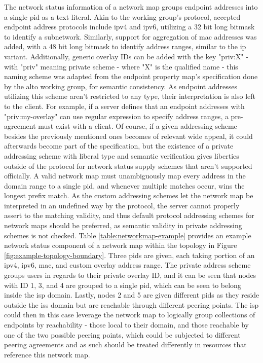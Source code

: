     The network status information of a network map groups endpoint addresses into a single \gls{pid} as a text literal.
    Akin to the working group's protocol, accepted endpoint address protocols include \gls{ipv4} and \gls{ipv6}, utilizing a 32 bit long bitmask to identify a subnetwork.
    Similarly, support for aggregation of \gls{mac} addresses was added, with a 48 bit long bitmask to identify address ranges, similar to the \gls{ip} variant.
    Additionally, generic overlay IDs can be added with the key "priv:X" - with "priv" meaning private scheme - where "X" is the qualified name - this naming scheme was adapted from the endpoint property map's specification done by the \gls{alto} working group, for semantic consistency.
    As endpoint addresses utilizing this scheme aren't restricted to any type, their interpretation is also left to the client.
    For example, if a server defines that an endpoint addresses with "priv:my-overlay" can use regular expression to specify address ranges, a pre-agreement must exist with a client.
    Of course, if a given addressing scheme besides the previously mentioned ones becomes of relevant wide appeal, it could afterwards become part of the specification, but the existence of a private addressing scheme with liberal type and semantic verification gives liberties outside of the protocol for network status supply schemes that aren't supported officially.
    A valid network map must unambiguously map every address in the domain range to a single \gls{pid}, and whenever multiple matches occur, wins the longest prefix match.
    As the custom addressing schemes let the network map be interpreted in an undefined way by the protocol, the server cannot properly assert to the matching validity, and thus default protocol addressing schemes for network maps should be preferred, as semantic validity in private addressing schemes is not checked.
    Table \ref{table:networkmap-example} provides an example network status component of a network map within the topology in Figure \ref{fig:example-topology-boundary}.
    Three \glspl{pid} are given, each taking portion of an \gls{ipv4}, \gls{ipv6}, \gls{mac}, and custom overlay address range.
    The private address scheme groups users in regards to their private overlay ID, and it can be seen that nodes with ID 1, 3, and 4 are grouped to a single \gls{pid}, which can be seen to belong inside the \gls{isp} domain.
    Lastly, nodes 2 and 5 are given different \glspl{pid} as they reside outside the \glspl{is} domain but are reachable through different peering points.
    The \gls{isp} could then in this case leverage the network map to logically group collections of endpoints by reachability - those local to their domain, and those reachable by one of the two possible peering points, which could be subjected to different peering agreements and as such should be treated differently in resources that reference this network map.

